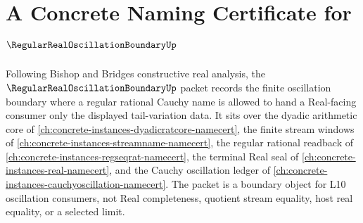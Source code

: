 \chapter{A Concrete Naming Certificate for $\RegularRealOscillationBoundaryUp$}
\label{ch:concrete-instances-regular-real-oscillation-boundary-namecert}

Following Bishop and Bridges constructive real analysis, the $\RegularRealOscillationBoundaryUp$ packet records the finite oscillation boundary where a regular rational Cauchy name is allowed to hand a Real-facing consumer only the displayed tail-variation data. It sits over the dyadic arithmetic core of \autoref{ch:concrete-instances-dyadicratcore-namecert}, the finite stream windows of \autoref{ch:concrete-instances-streamname-namecert}, the regular rational readback of \autoref{ch:concrete-instances-regseqrat-namecert}, the terminal Real seal of \autoref{ch:concrete-instances-real-namecert}, and the Cauchy oscillation ledger of \autoref{ch:concrete-instances-cauchyoscillation-namecert}. The packet is a boundary object for L10 oscillation consumers, not Real completeness, quotient stream equality, host real equality, or a selected limit.

